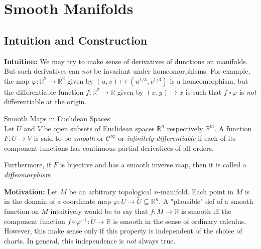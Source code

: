 \section{Smooth Manifolds}

\subsection{Intuition and Construction}

\noindent\textbf{Intuition:} We may try to make sense of derivatives of dunctions on manifolds. But such derivatives can \textit{not} be invariant under homeomorphisms. For example, the map $\varphi: \mathbb{R}^2 \to \mathbb{R}^2$ given by $(u,v) \mapsto (u^{1/3}, v^{1/3})$ is a homeomorphism, but the differentiable function $f: \mathbb{R}^2 \to \mathbb{R}$ given by $(x,y) \mapsto x$ is such that $f\circ \varphi$ is \textit{not} differentiable at the origin.

\begin{definition}{Smooth Maps in Euclidean Spaces}\\
Let $U$ and $V$ be open subsets of Euclidean spaces $\mathbb{R}^n$ respectively $\mathbb{R}^m$. A function $F:U\to V$ is said to be \textit{smooth} or $\mathcal{C}^{\infty}$ or \textit{infinitely differentiable} if each of its component functions has continuous partial derivatices of all orders.

Furthermore, if $F$ is bijective and has a smooth inverse map, then it is called a \textit{diffeomorphism}.
\end{definition}

\noindent\textbf{Motivation:} Let $M$ be an arbitrary topological $n$-manifold. Each point in $M$ is in the domain of a coordinate map $\varphi: U\to \tilde{U} \subseteq \mathbb{R}^n$. A "plausible" def of a smooth function on $M$ intuitively would be to say that $f:M\to \mathbb{R}$ is smooth iff the component function $f\circ \varphi^{-1}: \tilde{U} \to \mathbb{R}$ is smooth in the sense of ordinary calculus. However, this make sense only if this property is independent of the choice of charts. In general, this independence is \textit{not} always true.


